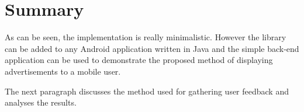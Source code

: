 \section{Summary}

As can be seen, the implementation is really minimalistic. However the library can be added to any Android application written in Java and the simple back-end application can be used to demonstrate the proposed method of displaying advertisements to a mobile user.

The next paragraph discusses the method used for gathering user feedback and analyses the results.

